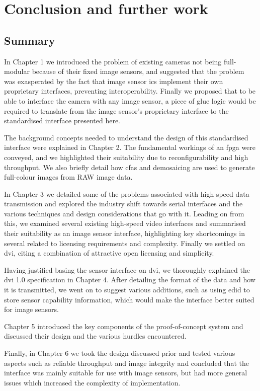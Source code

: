 \chapter{Conclusion and further work}



\section{Summary}
In Chapter 1 we introduced the problem of existing cameras not being full-modular because of their fixed image sensors, and suggested that the problem was exasperated by the fact that image sensor \glspl{ic} implement their own proprietary interfaces, preventing interoperability. Finally we proposed that to be able to interface the camera with any image sensor, a piece of glue logic would be required to translate from the image sensor's proprietary interface to the standardised interface presented here.

The background concepts needed to understand the design of this standardised interface were explained in Chapter 2. The fundamental workings of an \gls{fpga} were conveyed, and we highlighted their suitability due to reconfigurability and high throughput. We also briefly detail how \glspl{cfa} and demosaicing are used to generate full-colour images from RAW image data.

In Chapter 3 we detailed some of the problems associated with high-speed data transmission and explored the industry shift towards serial interfaces and the various techniques and design considerations that go with it. Leading on from this, we examined several existing high-speed video interfaces and summarised their suitability as an image sensor interface, highlighting key shortcomings in several related to licensing requirements and complexity. Finally we settled on \gls{dvi}, citing a combination of attractive open licensing and simplicity.

Having justified basing the sensor interface on \gls{dvi}, we thoroughly explained the \gls{dvi} 1.0 specification in Chapter 4. After detailing the format of the data and how it is transmitted, we went on to suggest various additions, such as using \gls{edid} to store sensor capability information, which would make the interface better suited for image sensors.

Chapter 5 introduced the key components of the proof-of-concept system and discussed their design and the various hurdles encountered. 

Finally, in Chapter 6 we took the design discussed prior and tested various aspects such as reliable throughput and image integrity and concluded that the interface was mainly suitable for use with image sensors, but had more general issues which increased the complexity of implementation.

